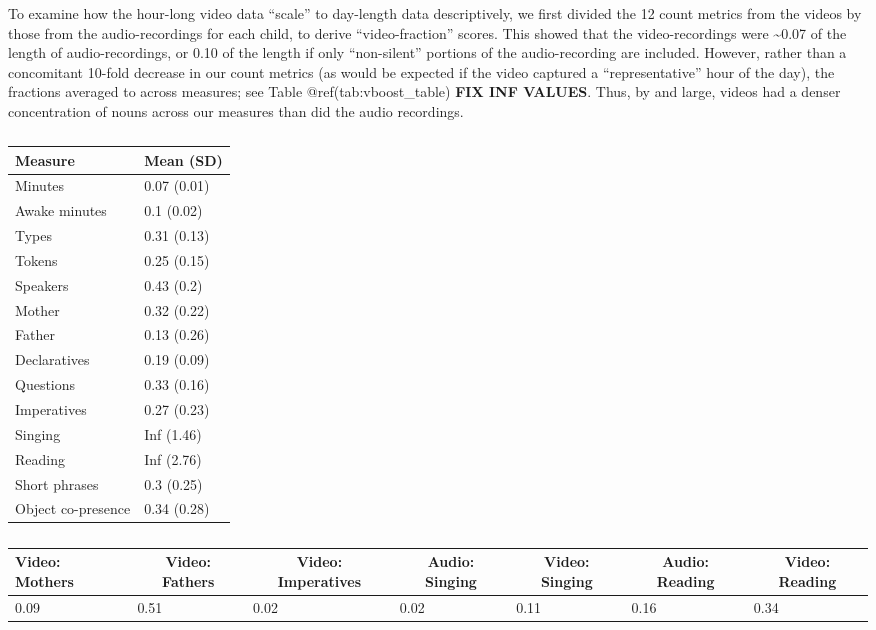 \documentclass[floatsintext,man]{apa6}
\theoremstyle{definition}
\theoremstyle{definition}
\theoremstyle{definition}
\theoremstyle{remark}
\begin{document}
To examine how the hour-long video data \enquote{scale} to day-length
data descriptively, we first divided the 12 count metrics from the
videos by those from the audio-recordings for each child, to derive
\enquote{video-fraction} scores. This showed that the video-recordings
were \textasciitilde{}0.07 of the length of audio-recordings, or 0.10 of
the length if only \enquote{non-silent} portions of the audio-recording
are included. However, rather than a concomitant 10-fold decrease in our
count metrics (as would be expected if the video captured a
\enquote{representative} hour of the day), the fractions averaged to
across measures; see Table @ref(tab:vboost\_table) \textbf{FIX INF
VALUES}. Thus, by and large, videos had a denser concentration of nouns
across our measures than did the audio recordings.

\begin{table}[tbp]
\begin{center}
\begin{threeparttable}
\caption{\label{tab:vboost-table}}
\begin{tabular}{ll}
\toprule
Measure & \multicolumn{1}{c}{Mean (SD)}\\
\midrule
Minutes & 0.07 (0.01)\\
Awake minutes & 0.1 (0.02)\\
Types & 0.31 (0.13)\\
Tokens & 0.25 (0.15)\\
Speakers & 0.43 (0.2)\\
Mother & 0.32 (0.22)\\
Father & 0.13 (0.26)\\
Declaratives & 0.19 (0.09)\\
Questions & 0.33 (0.16)\\
Imperatives & 0.27 (0.23)\\
Singing & Inf (1.46)\\
Reading & Inf (2.76)\\
Short phrases & 0.3 (0.25)\\
Object co-presence & 0.34 (0.28)\\
\bottomrule
\end{tabular}
\end{threeparttable}
\end{center}
\end{table}

\begin{table}[tbp]
\begin{center}
\begin{threeparttable}
\caption{\label{tab:propna-missing-tables}}
\begin{tabular}{lllllll}
\toprule
Video: Mothers & \multicolumn{1}{c}{Video: Fathers} & \multicolumn{1}{c}{Video: Imperatives} & \multicolumn{1}{c}{Audio: Singing} & \multicolumn{1}{c}{Video: Singing} & \multicolumn{1}{c}{Audio: Reading} & \multicolumn{1}{c}{Video: Reading}\\
\midrule
0.09 & 0.51 & 0.02 & 0.02 & 0.11 & 0.16 & 0.34\\
\bottomrule
\end{tabular}
\end{threeparttable}
\end{center}
\end{table}
\end{document}
